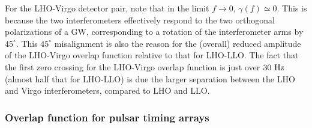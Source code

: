 For the LHO-Virgo detector pair, note 
that in the limit $f\rightarrow 0$, $\gamma(f)\simeq 0$.
This is because the two interferometers effectively respond
to the two orthogonal polarizations of a GW, corresponding 
to a rotation of the interferometer arms by $45^\circ$.
This $45^\circ$ misalignment is also the reason for the 
(overall) reduced amplitude of the LHO-Virgo overlap 
function relative to that for LHO-LLO.  
The fact that the first zero crossing for the LHO-Virgo 
overlap function is just over $30~{\rm Hz}$ (almost half 
that for LHO-LLO) is due the larger separation between the
LHO and Virgo interferometers, compared to LHO 
and LLO.

\subsubsection{Overlap function for pulsar timing arrays}

